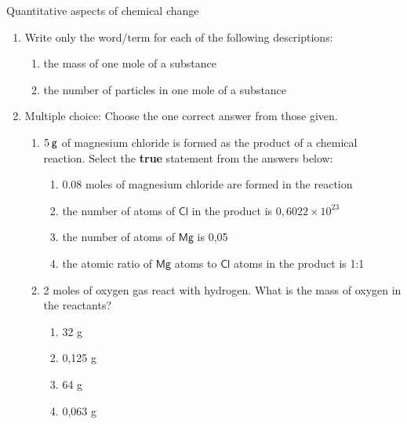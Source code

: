             \begin{eocexercises}{Quantitative aspects of chemical change}
            \nopagebreak \noindent
      \label{m38712*id286171}\begin{enumerate}[noitemsep, label=\textbf{\arabic*}. ] 
            \label{m38712*uid123}\item Write only the word/term for each of the following descriptions:
\label{m38712*id286187}\begin{enumerate}[noitemsep, label=\textbf{\alph*}. ] 
            \label{m38712*uid124}\item the mass of one mole of a substance
\label{m38712*uid125}\item the number of particles in one mole of a substance
\end{enumerate}
                \label{m38712*uid126}\item Multiple choice: Choose the one correct answer from those given.
\label{m38712*id286228}\begin{enumerate}[noitemsep, label=\textbf{\alph*}. ] 
            \label{m38712*uid127}\item $5\phantom{\rule{2pt}{0ex}}\mathsf{g}$ of magnesium chloride is formed as the product of a chemical reaction. Select the \textbf{true} statement from the answers below:
\label{m38712*id286251}\begin{enumerate}[noitemsep, label=\textbf{\alph*}. ] 
            \label{m38712*uid128}\item 0.08 moles of magnesium chloride are formed in the reaction
\label{m38712*uid129}\item the number of atoms of $\mathsf{Cl}$ in the product is $0,6022\ensuremath{\times}{10}^{23}$\label{m38712*uid130}\item the number of atoms of $\mathsf{Mg}$ is 0,05
\label{m38712*uid131}\item the atomic ratio of $\mathsf{Mg}$ atoms to $\mathsf{Cl}$ atoms in the product is 1:1
\end{enumerate}
                \label{m38712*uid132}\item 2 moles of oxygen gas react with hydrogen. What is the mass of oxygen in the reactants?
\label{m38712*id286339}\begin{enumerate}[noitemsep, label=\textbf{\alph*}. ] 
            \label{m38712*uid133}\item 32 g
\label{m38712*uid134}\item 0,125 g
\label{m38712*uid135}\item 64 g
\label{m38712*uid136}\item 0,063 g

\end{enumerate}
\end{enumerate}
\end{enumerate}
\end{eocexercises}
